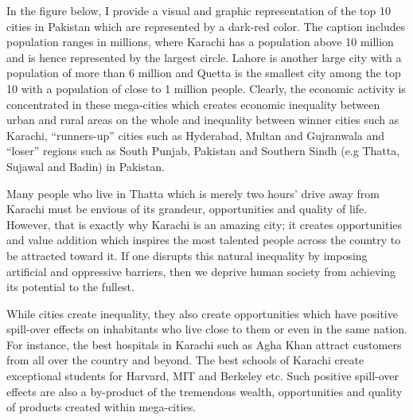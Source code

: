 \documentclass[12pt]{article}
\newcommand{\1}{\mathbbm 1}
\begin{document}
		
		In the figure below, I provide a visual and graphic representation of the top 10 cities in Pakistan which are represented by a dark-red color. The caption includes population ranges in millions, where Karachi has a population above 10 million and is hence represented by the largest circle. Lahore is another large city with a population of more than 6 million and Quetta is the smallest city among the top 10 with a population of close to 1 million people. Clearly, the economic activity is concentrated in these mega-cities which creates economic inequality between urban and rural areas on the whole and inequality between winner cities such as Karachi, ``runners-up'' cities such as Hyderabad, Multan and Gujranwala and ``loser'' regions such as South Punjab, Pakistan and Southern Sindh (e.g Thatta, Sujawal and Badin) in Pakistan. 
		
		Many people who live in Thatta which is merely two hours' drive away from Karachi must be envious of its grandeur, opportunities and quality of life. However, that is exactly why Karachi is an amazing city; it creates opportunities and value addition which inspires the most talented people across the country to be attracted toward it. If one disrupts this natural inequality by imposing artificial and oppressive barriers, then we deprive human society from achieving its potential to the fullest.
		
		
		While cities create inequality, they also create opportunities which have positive spill-over effects on inhabitants who live close to them or even in the same nation. For instance, the best hospitals in Karachi such as Agha Khan attract customers from all over the country and beyond. The best schools of Karachi create exceptional students for Harvard, MIT and Berkeley etc. Such positive spill-over effects are also a by-product of the tremendous wealth, opportunities and quality of products created within mega-cities.
		
		 
		
		
		
		
		
		\begin{figure}[H]
			\centering
			\scalebox{1}{}
			\hfill
			\caption{}
		\end{figure}
		
		
	
		
		
		
		
		
		
		
		
\end{document}
